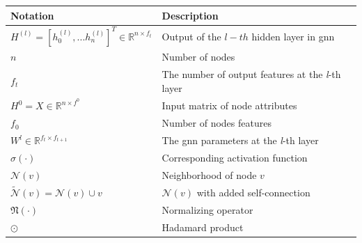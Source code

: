 \begin{center}
    \begin{tabular}{ll}
        \toprule
        \textbf{Notation}                                                         & \textbf{Description}                                     \\
        \midrule
        $H^{(l)}= [h_{0}^{(l)},...h_{n}^{(l)}]^T \in \mathbb{R}^{n \times f_{t}}$ & Output of the $l-th$ hidden layer in \ac{gnn}            \\
        $n$                                                                       & Number of nodes                                          \\
        $f_{t}$                                                                   & The number of output features at the \textit{l}-th layer \\
        $H^{0}= X \in \mathbb{R}^{n \times f^{0}}$                                & Input matrix of node attributes                          \\
        $f_{0}$                                                                   & Number of nodes features                                 \\
        $W^{l} \in \mathbb{R}^{f_{t} \times f_{t+1}}$                             & The \ac{gnn} parameters at the \textit{l}-th layer       \\
        $\sigma (\cdot)$                                                          & Corresponding activation function                        \\
        $\mathcal{N}(v)$                                                          & Neighborhood of node $v$                                 \\
        $\tilde{\mathcal{N}}(v) = \mathcal{N}(v) \cup {v}$                        & $\mathcal{N}(v)$  with added self-connection             \\
        $\mathfrak{N}(\cdot)$                                                     & Normalizing operator                                     \\
        $\odot$                                                                   & Hadamard product                                         \\
        \bottomrule
    \end{tabular}
\end{center}

